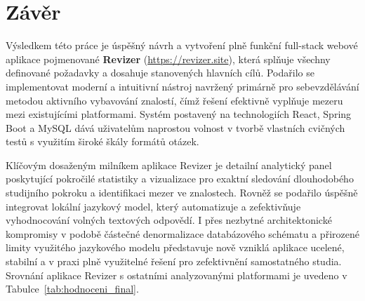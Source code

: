 \documentclass{vskpou} %
\begin{document}
\section{Závěr}

Výsledkem této práce je úspěšný návrh a vytvoření plně funkční full-stack webové aplikace pojmenované \textbf{Revizer} (\url{https://revizer.site}), která splňuje všechny definované požadavky a dosahuje stanovených hlavních cílů. Podařilo se implementovat moderní a intuitivní nástroj navržený primárně pro sebevzdělávání metodou aktivního vybavování znalostí, čímž řešení efektivně vyplňuje mezeru mezi existujícími platformami. Systém postavený na technologiích React, Spring Boot a MySQL dává uživatelům naprostou volnost v tvorbě vlastních cvičných testů s využitím široké škály formátů otázek.

Klíčovým dosaženým milníkem aplikace Revizer je detailní analytický panel poskytující pokročilé statistiky a vizualizace pro exaktní sledování dlouhodobého studijního pokroku a identifikaci mezer ve znalostech. Rovněž se podařilo úspěšně integrovat lokální jazykový model, který automatizuje a zefektivňuje vyhodnocování volných textových odpovědí. I přes nezbytné architektonické kompromisy v podobě částečné denormalizace databázového schématu a přirozené limity využitého jazykového modelu představuje nově vzniklá aplikace ucelené, stabilní a v praxi plně využitelné řešení pro zefektivnění samostatného studia. Srovnání aplikace Revizer s ostatními analyzovanými platformami je uvedeno v Tabulce~\ref{tab:hodnoceni_final}.
\end{document}
